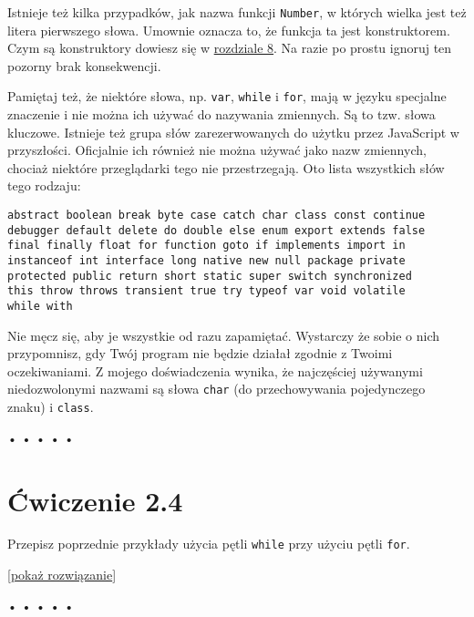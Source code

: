     
Istnieje też kilka przypadków, jak nazwa funkcji \texttt{Number}, w których wielka jest też litera pierwszego słowa. Umownie oznacza to, że funkcja ta jest konstruktorem. Czym są konstruktory dowiesz się w \hyperref[chap:8]{rozdziale 8}. Na razie po prostu ignoruj ten pozorny brak konsekwencji.

    
Pamiętaj też, że niektóre słowa, np. \texttt{var}, \texttt{while} i \texttt{for}, mają w języku specjalne znaczenie i nie można ich używać do nazywania zmiennych. Są to tzw. słowa kluczowe. Istnieje też grupa słów zarezerwowanych do użytku przez JavaScript w przyszłości. Oficjalnie ich również nie można używać jako nazw zmiennych, chociaż niektóre przeglądarki tego nie przestrzegają. Oto lista wszystkich słów tego rodzaju:

\begin{verbatim} 
abstract boolean break byte case catch char class const continue
debugger default delete do double else enum export extends false
final finally float for function goto if implements import in
instanceof int interface long native new null package private
protected public return short static super switch synchronized
this throw throws transient true try typeof var void volatile
while with
\end{verbatim}
    
Nie męcz się, aby je wszystkie od razu zapamiętać. Wystarczy że sobie o nich przypomnisz, gdy Twój program nie będzie działał zgodnie z Twoimi oczekiwaniami. Z mojego doświadczenia wynika, że najczęściej używanymi niedozwolonymi nazwami są słowa \texttt{char} (do przechowywania pojedynczego znaku) i \texttt{class}.

  
\begin{center}
• • • • •
\end{center}
  
\section*{Ćwiczenie 2.4}
\label{sec:2.4}
    
      
Przepisz poprzednie przykłady użycia pętli \texttt{while} przy użyciu pętli \texttt{for}.

    
 [\hyperref[sol:2.4]{pokaż rozwiązanie}]
    
    
  
\begin{center}
• • • • •
\end{center}
  
